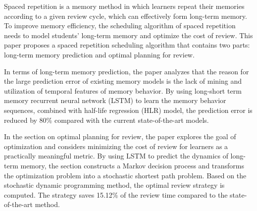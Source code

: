 \begin{eabstract}
  Spaced repetition is a memory method in which learners repeat their memories according to a given review cycle, which can effectively form long-term memory. To improve memory efficiency, the scheduling algorithm of spaced repetition needs to model students' long-term memory and optimize the cost of review. This paper proposes a spaced repetition scheduling algorithm that contains two parts: long-term memory prediction and optimal planning for review.

  In terms of long-term memory prediction, the paper analyzes that the reason for the large prediction error of existing memory models is the lack of mining and utilization of temporal features of memory behavior. By using long-short term memory recurrent neural network (LSTM) to learn the memory behavior sequences, combined with half-life regression (HLR) model, the prediction error is reduced by 80\% compared with the current state-of-the-art models.

  In the section on optimal planning for review, the paper explores the goal of optimization and considers minimizing the cost of review for learners as a practically meaningful metric. By using LSTM to predict the dynamics of long-term memory, the section constructs a Markov decision process and transforms the optimization problem into a stochastic shortest path problem. Based on the stochastic dynamic programming method, the optimal review strategy is computed. The strategy saves 15.12\% of the review time compared to the state-of-the-art method.
\end{eabstract}
